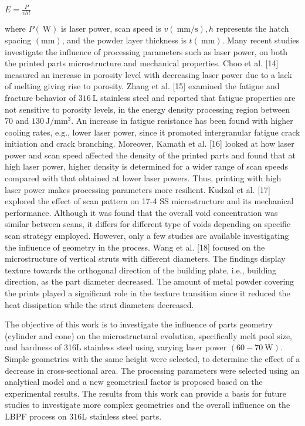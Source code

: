 \documentclass[10pt]{article}
\begin{document}
$E=\frac{P}{v h t}$

where $P(\mathrm{~W})$ is laser power, scan speed is $v(\mathrm{~mm} / \mathrm{s}), h$ represents the hatch spacing $(\mathrm{mm})$, and the powder layer thickness is $t(\mathrm{~mm})$. Many recent studies investigate the influence of processing parameters such as laser power, on both the printed parts microstructure and mechanical properties. Choo et al. [14] measured an increase in porosity level with decreasing laser power due to a lack of melting giving rise to porosity. Zhang et al. [15] examined the fatigue and fracture behavior of $316 \mathrm{~L}$ stainless steel and reported that fatigue properties are not sensitive to porosity levels, in the energy density processing region between 70 and $130 \mathrm{~J} / \mathrm{mm}^{3}$. An increase in fatigue resistance has been found with higher cooling rates, e.g., lower laser power, since it promoted intergranular fatigue crack initiation and crack branching. Moreover, Kamath et al. [16] looked at how laser power and scan speed affected the density of the printed parts and found that at high laser power, higher density is determined for a wider range of scan speeds compared with that obtained at lower laser powers. Thus, printing with high laser power makes processing parameters more resilient. Kudzal et al. [17] explored the effect of scan pattern on 17-4 SS microstructure and its mechanical performance. Although it was found that the overall void concentration was similar between scans, it differs for different type of voids depending on specific scan strategy employed. However, only a few studies are available investigating the influence of geometry in the process. Wang et al. [18] focused on the microstructure of vertical struts with different diameters. The findings display texture towards the orthogonal direction of the building plate, i.e., building direction, as the part diameter decreased. The amount of metal powder covering the prints played a significant role in the texture transition since it reduced the heat dissipation while the strut diameters decreased.

The objective of this work is to investigate the influence of parts geometry (cylinder and cone) on the microstructural evolution, specifically melt pool size, and hardness of 316L stainless steel using varying laser power $(60-70 \mathrm{~W})$. Simple geometries with the same height were selected, to determine the effect of a decrease in cross-sectional area. The processing parameters were selected using an analytical model and a new geometrical factor is proposed based on the experimental results. The results from this work can provide a basis for future studies to investigate more complex geometries and the overall influence on the LBPF process on 316L stainless steel parts.
\end{document}

